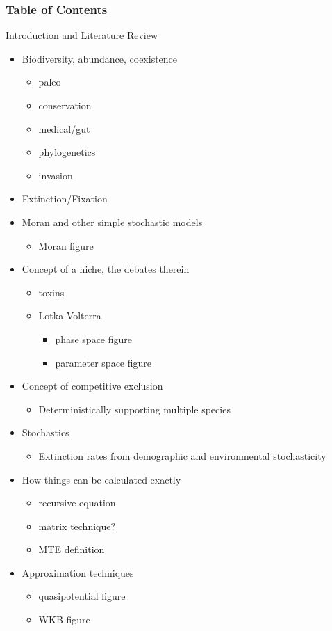 \documentclass[8pt]{beamer}
\begin{document}
\begin{frame}
\frametitle{Table of Contents}
Introduction and Literature Review
\begin{itemize}
	\item Biodiversity, abundance, coexistence
	\begin{itemize}
		\item paleo
		\item conservation
		\item medical/gut
		\item phylogenetics
		\item invasion
	\end{itemize}
	\item Extinction/Fixation
	\item Moran and other simple stochastic models
	\begin{itemize}
		\item Moran figure
	\end{itemize}
	\item Concept of a niche, the debates therein
	\begin{itemize}
		\item toxins
		\item Lotka-Volterra
		\begin{itemize}
			\item phase space figure
			\item parameter space figure
		\end{itemize}
	\end{itemize}
	\item Concept of competitive exclusion
	\begin{itemize}
		\item Deterministically supporting multiple species
	\end{itemize}
	\item Stochastics
	\begin{itemize}
		\item Extinction rates from demographic and environmental stochasticity
	\end{itemize}
	\item How things can be calculated exactly
	\begin{itemize}
		\item recursive equation
		\item matrix technique?
		\item MTE definition
	\end{itemize}
	\item Approximation techniques
	\begin{itemize}
		\item quasipotential figure
		\item WKB figure
	\end{itemize}
\end{itemize}
\end{frame}
\end{document}
